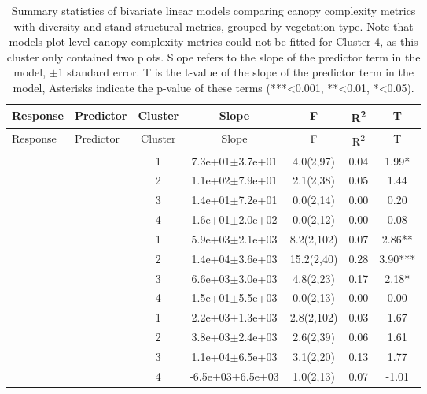 \setlength{\tabcolsep}{4pt}
\begin{longtable}[H]{llccccS[table-format=-2.2, table-space-text-post = {***}]}
\caption[Bivariate linear model summary by vegetation type]{Summary statistics of bivariate linear models comparing canopy complexity metrics with diversity and stand structural metrics, grouped by vegetation type. Note that models plot level canopy complexity metrics could not be fitted for Cluster 4, as this cluster only contained two plots. Slope refers to the slope of the predictor term in the model, $\pm$1 standard error.  T is the t-value of the slope of the predictor term in the model, Asterisks indicate the p-value of these terms (***<0.001, **<0.01, *<0.05).} \\ 
  \toprule
{Response} & {Predictor} & {Cluster} & {Slope} & {F} & {R\textsuperscript{2}} & {T} \\ 
  \midrule
\endfirsthead
\toprule
{Response} & {Predictor} & {Cluster} & {Slope} & {F} & {R\textsuperscript{2}} & {T} \\ 
\midrule
\endhead
{} & {} & 1 &  7.3e+01$\pm$3.7e+01 & 4.0(2,97) & 0.04 & 1.99* \\*
   &  & 2 &  1.1e+02$\pm$7.9e+01 & 2.1(2,38) & 0.05 & 1.44 \\* 
   &  & 3 &  1.4e+01$\pm$7.2e+01 & 0.0(2,14) & 0.00 & 0.20 \\* 
   &  & 4 &  1.6e+01$\pm$2.0e+02 & 0.0(2,12) & 0.00 & 0.08 \\
   \midrule
{} & {} & 1 &  5.9e+03$\pm$2.1e+03 & 8.2(2,102) & 0.07 & 2.86** \\* 
   &  & 2 &  1.4e+04$\pm$3.6e+03 & 15.2(2,40) & 0.28 & 3.90*** \\* 
   &  & 3 &  6.6e+03$\pm$3.0e+03 & 4.8(2,23) & 0.17 & 2.18* \\* 
   &  & 4 &  1.5e+01$\pm$5.5e+03 & 0.0(2,13) & 0.00 & 0.00 \\ 
   \midrule
{} & {} & 1 &  2.2e+03$\pm$1.3e+03 & 2.8(2,102) & 0.03 & 1.67 \\* 
   &  & 2 &  3.8e+03$\pm$2.4e+03 & 2.6(2,39) & 0.06 & 1.61 \\* 
   &  & 3 &  1.1e+04$\pm$6.5e+03 & 3.1(2,20) & 0.13 & 1.77 \\* 
   &  & 4 & -6.5e+03$\pm$6.5e+03 & 1.0(2,13) & 0.07 & -1.01 \\ 

\end{longtable}
